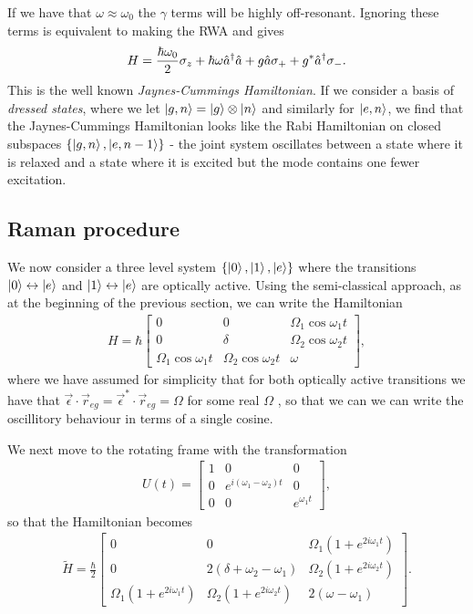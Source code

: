 If we have that $\omega \approx \omega_0$ the $\gamma$ terms will be highly off-resonant. Ignoring these terms is equivalent to making the RWA and gives
\begin{align}
  H = \frac{\hbar \omega_0}{2} \mathbf{\sigma}_z + \hbar \omega \hat{a}^\dagger\hat{a} + g\hat{a} \mathbf{\sigma}_{+} + g^{*}\hat{a}^\dagger \mathbf{\sigma}_{-}.
\end{align}
This is the well known \textit{Jaynes-Cummings Hamiltonian}. If we consider a basis of \textit{dressed states}, where we let $\left\vert g, n\right\rangle = \left\vert g\right\rangle\otimes\left\vert n\right\rangle$ and similarly for $\left\vert e, n\right\rangle$, we find that the Jaynes-Cummings Hamiltonian looks like the Rabi Hamiltonian on closed subspaces $\{\left\vert g, n\right\rangle, \left\vert e, n-1\right\rangle\}$ - the joint system oscillates between a state where it is relaxed and a state where it is excited but the mode contains one fewer excitation.

\subsection{Raman procedure}

We now consider a three level system $\{\left\vert0\right\rangle, \left\vert1\right\rangle, \left\vert e\right\rangle\}$ where the transitions $\left\vert0\right\rangle \leftrightarrow \left\vert e\right\rangle$ and $\left\vert1\right\rangle \leftrightarrow \left\vert e\right\rangle$ are optically active. Using the semi-classical approach, as at the beginning of the previous section, we can write the Hamiltonian
\begin{align}
  H=\hbar
  \begin{bmatrix}
    0 & 0 & \Omega_1 \cos\omega_1 t \\
    0 & \delta & \Omega_2 \cos\omega_2 t \\
    \Omega_1 \cos\omega_1 t & \Omega_2 \cos\omega_2 t & \omega
  \end{bmatrix},
\end{align}
where we have assumed for simplicity that for both optically active transitions we have that $\vec{\epsilon}\cdot \vec{r}_{eg} = \vec{\epsilon}^*\cdot \vec{r}_{eg} = \Omega$ for some real $\Omega$ , so that we can we can write the oscillitory behaviour in terms of a single cosine.

We next move to the rotating frame with the transformation
\begin{align}
  U(t) = 
  \begin{bmatrix}
    1 & 0 & 0 \\
    0 & e^{i(\omega_1 - \omega_2)t} & 0 \\
    0 & 0 & e^{\omega_1 t}
  \end{bmatrix},
\end{align}
so that the Hamiltonian becomes
\begin{align}
  \tilde{H}=\frac{\hbar}{2}
  \begin{bmatrix}
    0 & 0 & \Omega_1(1+e^{2i\omega_1 t}) \\
    0 & 2(\delta + \omega_2 - \omega_1) & \Omega_2 (1+e^{2i\omega_2 t}) \\
    \Omega_1(1+e^{2i\omega_1 t}) & \Omega_2 (1+e^{2i\omega_2 t}) & 2(\omega - \omega_1)
  \end{bmatrix}.
\end{align}

